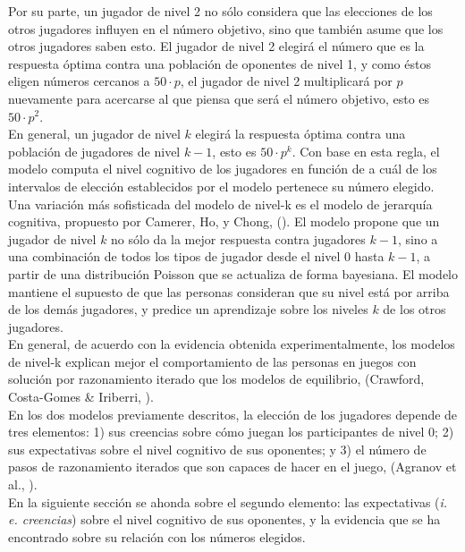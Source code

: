 Por su parte, un jugador de nivel 2 no sólo considera que las elecciones de los otros jugadores influyen en el número objetivo, sino que también asume que los otros jugadores saben esto. El jugador de nivel 2 elegirá el número que es la respuesta óptima contra una población de oponentes de nivel 1, y como éstos eligen números cercanos a $50 \cdot p$, el jugador de nivel 2 multiplicará por $p$ nuevamente para acercarse al que piensa que será el número objetivo, esto es $50 \cdot p^2$.\\

En general, un jugador de nivel $k$ elegirá la respuesta óptima contra una población de jugadores de nivel $k-1$, esto es $50 \cdot p^k$.  Con base en esta regla, el modelo computa el nivel cognitivo de los jugadores en función de a cuál de los intervalos de elección establecidos por el modelo pertenece su número elegido.\\

Una variación más sofisticada del modelo de nivel-k es el modelo de jerarquía cognitiva, propuesto por Camerer, Ho, y Chong, (\citeyear{Camerer}). El modelo propone que un jugador de nivel $k$ no sólo da la mejor respuesta contra jugadores $k-1$, sino a una combinación de todos los tipos de jugador desde el nivel 0 hasta $k-1$, a partir de una distribución Poisson que se actualiza de forma bayesiana. El modelo mantiene el supuesto de que las personas consideran que su nivel está por arriba de los demás jugadores, y predice un aprendizaje sobre los niveles $k$ de los otros jugadores.\\

En general, de acuerdo con la evidencia obtenida experimentalmente, los modelos de nivel-k explican mejor el comportamiento de las personas en juegos con solución por razonamiento iterado que los modelos de equilibrio, (Crawford, Costa-Gomes & Iriberri, \citeyear{Crawford}).\\

En los dos modelos previamente descritos, la elección de los jugadores depende de tres elementos: 1) sus creencias sobre cómo juegan los participantes de nivel 0; 2) sus expectativas sobre el nivel cognitivo de sus oponentes; y 3) el número de pasos de razonamiento iterados que son capaces de hacer en el juego, (Agranov et al., \citeyear{Agranov}).\\

En la siguiente sección se ahonda sobre el segundo elemento: las expectativas (\textit{i. e. creencias}) sobre el nivel cognitivo de sus oponentes, y la evidencia que se ha encontrado sobre su relación con los números elegidos.\\

